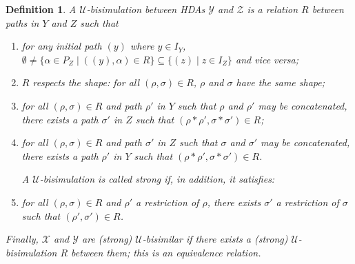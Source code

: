\documentclass[11pt,a4paper,oldfontcommands]{memoir}
\newtheorem{definition}{Definition}
\begin{document}
 \begin{definition} \label{def: U bisimulation}
 A \emph{$\mathcal{U}$-bisimulation} between HDAs $\mathcal{Y}$ and $\mathcal{Z}$ is a relation $R$ between paths in $Y$ and $Z$ such that
\begin{enumerate}
\item \label{en: U bisim.e1} for any initial path $(y)$ where $ y\in I_Y$, $\emptyset \neq \{\alpha \in P_Z \mid ((y),\alpha) \in R \} \subseteq \{(z)\mid z \in I_Z \}$ and vice versa;%
\item \label{en: U bisim.e3} $R$ respects the shape: for all
  $( \rho, \sigma)\in R$, $\rho$ and $ \sigma$ have the same shape;
\item \label{en: U bisim.e4} for all $( \rho, \sigma)\in R$ and path
  $\rho'$ in $Y$ such that $\rho$ and $\rho'$ may be concatenated,
  there exists a path $\sigma'$ in $Z$ such that $( \rho * \rho',
  \sigma* \sigma')\in R$;
\item \label{en: U bisim.e5} for all $( \rho, \sigma)\in R$ and path
  $\sigma'$ in $Z$ such that $\sigma$ and $\sigma'$ may be
  concatenated, there exists a path $\rho'$ in $Y$ such that
  $( \rho* \rho', \sigma* \sigma')\in R$. %
  
  A $\mathcal{U}$-bisimulation is called strong if, in addition, it satisfies:
\item \label{en: U bisim.e6} for all $( \rho, \sigma)\in R$ and $\rho'$ a restriction of $\rho$, there exists $\sigma'$ a restriction of $\sigma$ such that $( \rho',\sigma')\in R$.
\end{enumerate}
Finally, $\mathcal{X}$ and $\mathcal{Y}$ are (strong) \emph{$\mathcal{U}$-bisimilar} if there exists a (strong) $\mathcal{U}$-bisimulation $R$ between them; this is an equivalence relation.
\end{definition}
\end{document}
